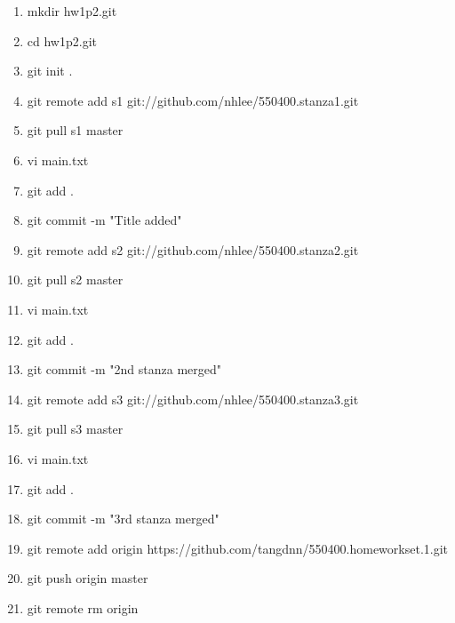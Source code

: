 \documentclass[12pt]{article}
\begin{document}
\begin{enumerate}
\item mkdir hw1p2.git
\item cd hw1p2.git
\item git init .
\item git remote add s1 git://github.com/nhlee/550400.stanza1.git
\item git pull s1 master
\item vi main.txt
\item git add .
\item git commit -m "Title added"
\item git remote add s2 git://github.com/nhlee/550400.stanza2.git
\item git pull s2 master
\item vi main.txt
\item git add .
\item git commit -m "2nd stanza merged"
\item git remote add s3 git://github.com/nhlee/550400.stanza3.git
\item git pull s3 master
\item vi main.txt
\item git add .
\item git commit -m "3rd stanza merged"
\item git remote add origin https://github.com/tangdnn/550400.homeworkset.1.git
\item git push origin master
\item git remote rm origin
\end{enumerate}
\end{document}
